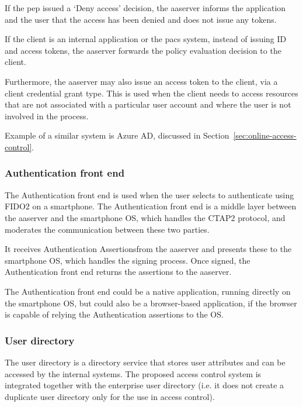 If the \acrshort{pep} issued a `Deny access' decision, the \acrshort{aaserver} informs the application and the user that the access has been denied and does not issue any tokens. 
    
If the client is an internal application or the \acrshort{pacs} system, instead of issuing ID and access tokens, the \acrshort{aaserver} forwards the policy evaluation decision to the client.

Furthermore, the \acrshort{aaserver} may also issue an access token to the client, via a client credential grant type. This is used when the client needs to access resources that are not associated with a particular user account and where the user is not involved in the process.

Example of a similar system is Azure AD, discussed in Section~\ref{sec:online-access-control}.
    
\subsubsection{Authentication front end}
The Authentication front end is used when the user selects to authenticate using FIDO2 on a smartphone. The Authentication front end is a middle layer between the \acrshort{aaserver} and the smartphone OS, which handles the CTAP2 protocol, and moderates the communication between these two parties.

It receives Authentication Assertions\footnotemark from the \acrshort{aaserver} and presents these to the smartphone OS, which handles the signing process. Once signed, the Authentication front end returns the assertions to the \acrshort{aaserver}.
% 

The Authentication front end could be a native application, running directly on the smartphone OS, but could also be a browser-based application, if the browser is capable of relying the Authentication assertions to the OS\footnotemark.
% 

\subsubsection{User directory}
The user directory is a directory service that stores user attributes and can be accessed by the internal systems. The proposed access control system is integrated together with the enterprise user directory (i.e. it does not create a duplicate user directory only for the use in access control).

